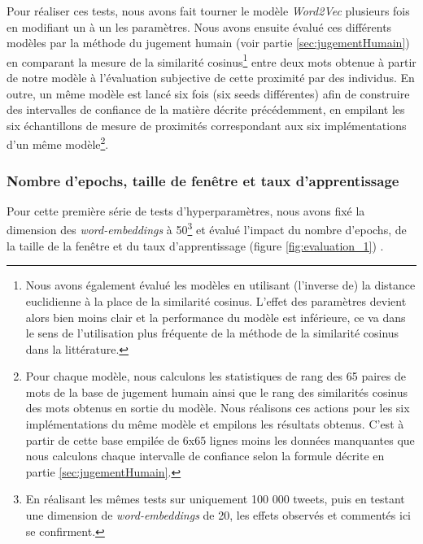 \documentclass[11pt,french,french]{article}
\let\rmarkdownfootnote\footnote%
\def\footnote{\protect\rmarkdownfootnote}
\begin{document}
Pour réaliser ces tests, nous avons fait tourner le modèle
\emph{Word2Vec} plusieurs fois en modifiant un à un les paramètres. Nous
avons ensuite évalué ces différents modèles par la méthode du
\og jugement humain \fg{} (voir partie \ref{sec:jugementHumain}) en
comparant la mesure de la similarité cosinus\footnote{Nous avons
  également évalué les modèles en utilisant (l'inverse de) la distance
  euclidienne à la place de la similarité cosinus. L'effet des
  paramètres devient alors bien moins clair et la performance du modèle
  est inférieure, ce va dans le sens de l'utilisation plus fréquente de
  la méthode de la similarité cosinus dans la littérature.} entre deux
mots obtenue à partir de notre modèle à l'évaluation subjective de cette
proximité par des individus. En outre, un même modèle est lancé six fois
(six \og seeds \fg{} différentes) afin de construire des intervalles de
confiance de la matière décrite précédemment, en empilant les six
échantillons de mesure de proximités correspondant aux six
implémentations d'un même modèle\footnote{Pour chaque modèle, nous
  calculons les statistiques de rang des 65 paires de mots de la base de
  jugement humain ainsi que le rang des similarités cosinus des mots
  obtenus en sortie du modèle. Nous réalisons ces actions pour les six
  implémentations du même modèle et empilons les résultats obtenus.
  C'est à partir de cette base empilée de 6x65 lignes moins les données
  manquantes que nous calculons chaque intervalle de confiance selon la
  formule décrite en partie \ref{sec:jugementHumain}.}.

\subsubsection{Nombre d'epochs, taille de fenêtre et taux
d'apprentissage}\label{nombre-depochs-taille-de-fenuxeatre-et-taux-dapprentissage}

Pour cette première série de tests d'hyperparamètres, nous avons fixé la
dimension des \emph{word-embeddings} à 50\footnote{En réalisant les
  mêmes tests sur uniquement 100 000 tweets, puis en testant une
  dimension de \emph{word-embeddings} de 20, les effets observés et
  commentés ici se confirment.} et évalué l'impact du nombre d'epochs,
de la taille de la fenêtre et du taux d'apprentissage (figure
\ref{fig:evaluation_1}) .
\end{document}
